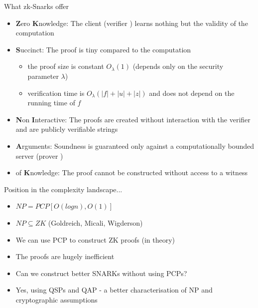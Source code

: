 \documentclass[handout]{beamer}
\begin{document}
\begin{frame}{What zk-Snarks offer}
\begin{itemize}
    \item \textbf{Z}ero \textbf{K}nowledge: The client (verifier \ver) learns nothing but the validity of the computation
    \item \textbf{S}uccinct: The proof is tiny compared to the computation 
    \begin{itemize}
        \item the proof size is constant $O_{\lambda}(1)$ (depends only on the security parameter $\lambda$)
        \item verification time is $O_{\lambda}(|f| + |u| + |z|)$ and does not depend on the running time of $f$
    \end{itemize}
    \item \textbf{N}on \textbf{I}nteractive: The proofs are created without interaction with the verifier and are publicly verifiable strings
    \item \textbf{A}rguments: Soundness is guaranteed only against a computationally bounded server (prover \prv)
    \item of \textbf{K}nowledge: The proof cannot be constructed without access to a witness
\end{itemize}
\end{frame}

\begin{frame}{Position in the complexity landscape...}
    \begin{itemize}
        \item $NP = PCP[O(logn),O(1)]$
        \item $NP \subseteq ZK$ (Goldreich, Micali, Wigderson)
        \item We can use PCP to construct ZK proofs (in theory)
        \item The proofs are hugely inefficient
        \item Can we construct better SNARKs without using PCPs?
        \item Yes, using QSPs and QAP - a better characterisation of NP and cryptographic assumptions
    \end{itemize}
\end{frame}
\end{document}
